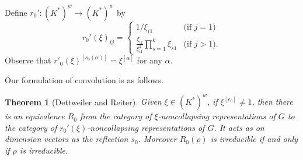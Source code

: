 \documentclass{amsart}
\theoremstyle{plain}
\newtheorem{thm}{Theorem}[section]
\theoremstyle{definition}
\theoremstyle{remark}
\begin{document}
Define $r_0':(K^*)^w\to (K^*)^w$ by
\[
r_0'(\xi)_{ij} = \begin{cases}
1/\xi_{i1} & \text{(if $j=1$)} \\
\frac{\xi_{ij}}{\xi^2_{i1}} \prod_{s=1}^k \xi_{s1} & \text{(if $j>1$).}
\end{cases}
\]
Observe that $r'_0(\xi)^{[s_0(\alpha)]}=\xi^{[\alpha]}$ for any $\alpha$.

Our formulation of convolution is as follows.


\begin{thm}[Dettweiler and Reiter]\label{t:conv}
Given $\xi\in(K^*)^w$, if $\xi^{[\epsilon_0]}\neq 1$, then
there is an equivalence $R_0$ from the category of $\xi$-noncollapsing
representations of $G$ to the category of $r_0'(\xi)$-noncollapsing representations
of $G$. It acts as on dimension vectors as the reflection $s_0$. Moreover $R_0(\rho)$
is irreducible if and only if $\rho$ is irreducible.
\end{thm}
\end{document}
